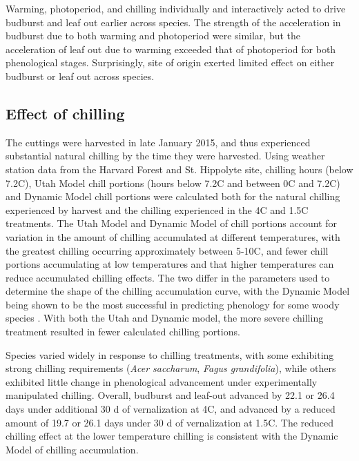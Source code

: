 \documentclass[11pt]{article}
\begin{document}
Warming, photoperiod, and chilling individually and interactively acted to drive budburst and leaf out earlier across species. The strength of the acceleration in budburst due to both warming and photoperiod were similar, but the acceleration of leaf out due to warming exceeded that of photoperiod for both phenological stages. Surprisingly, site of origin exerted limited effect on either budburst or leaf out across species. 

\subsection*{Effect of chilling}
The cuttings were harvested in late January 2015, and thus experienced substantial natural chilling by the time they were harvested. Using weather station data from the Harvard Forest and St. Hippolyte site, chilling hours (below 7.2\degree C), Utah Model chill portions (hours below 7.2\degree C and between 0\degree C and 7.2\degree C) and Dynamic Model \cite{Erez:1988} chill portions were calculated both for the natural chilling experienced by harvest and the chilling experienced in the 4\degree C and 1.5\degree C treatments. The Utah Model and Dynamic Model of chill portions account for variation in the amount of chilling accumulated at different temperatures, with the greatest chilling occurring approximately between 5-10\degree C, and fewer chill portions accumulating at low temperatures and that higher temperatures can reduce accumulated chilling effects. The two differ in the parameters used to determine the shape of the chilling accumulation curve, with the Dynamic Model being shown to be the most successful in predicting phenology for some woody species \cite{Luedeling:2009}.
With both the Utah and Dynamic model, the more severe chilling treatment resulted in fewer calculated chilling portions. 

Species varied widely in response to chilling treatments, with some exhibiting strong chilling requirements (\emph{Acer saccharum}, \emph{Fagus grandifolia}), while others exhibited little change in phenological advancement under experimentally manipulated chilling. Overall, budburst and leaf-out advanced by 22.1 or 26.4 days under additional 30 d of vernalization at 4\degree C, and advanced by a reduced amount of 19.7 or 26.1 days under 30 d of vernalization at 1.5\degree C. The reduced chilling effect at the lower temperature chilling is consistent with the Dynamic Model of chilling accumulation. %
\end{document}
